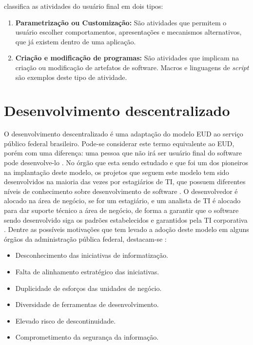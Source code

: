  classifica as atividades do usuário final em dois tipos:

\begin{enumerate}
\item \textbf{Parametrização ou Customização:} São atividades que permitem o usuário escolher comportamentos, apresentações e mecanismos  alternativos, que já existem dentro de uma aplicação.

\item \textbf{Criação e modificação de programas:} São atividades que implicam na criação ou modificação de artefatos de software. Macros e linguagens de \textit{script} são exemplos deste tipo de atividade.
\end{enumerate}

\section{Desenvolvimento descentralizado}

O desenvolvimento descentralizado é uma adaptação do modelo EUD ao serviço público federal brasileiro. Pode-se considerar este termo equivalente ao EUD, porém com uma diferença: uma pessoa que não irá ser usuário final do software pode desenvolve-lo \cite{artigoTcuGovTI}. No órgão que esta sendo estudado e que foi um dos pioneiros na implantação deste modelo, os projetos que seguem este modelo tem sido desenvolvidos na maioria das vezes por estagiários de TI, que possuem diferentes níveis de conhecimento sobre desenvolvimento de software \cite{artigoTcuGovTI}. O desenvolvedor é alocado na área de negócio, se for um estagiário, e um analista de TI é alocado para dar suporte técnico a área de negócio, de forma a garantir que o software sendo desenvolvido siga os padrões estabelecidos e garantidos pela TI corporativa \cite{artigoTcuGovTI}.
Dentre as possíveis motivações que tem levado a adoção deste modelo em alguns órgãos da administração pública federal, destacam-se \cite{slideTCU}:

\begin{itemize}
\item Desconhecimento das iniciativas de informatização.
\item Falta de alinhamento estratégico das iniciativas.
\item Duplicidade de esforços das unidades de negócio.
\item Diversidade de ferramentas de desenvolvimento.
\item Elevado risco de descontinuidade.
\item Comprometimento da segurança da informação.
\end{itemize}


